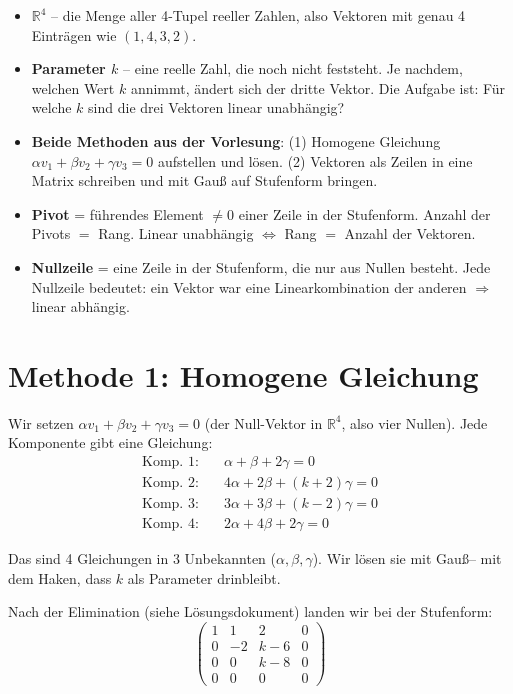 \documentclass[a4paper,12pt]{article}
\begin{document}
\begin{begriffe}
\begin{itemize}[leftmargin=*, nosep]
    \item $\mathbb{R}^4$ -- die Menge aller 4-Tupel reeller Zahlen, also Vektoren mit genau 4 Eintr\"agen wie $(1,4,3,2)$.
    \item \textbf{Parameter $k$} -- eine reelle Zahl, die noch nicht feststeht. Je nachdem, welchen Wert $k$ annimmt, \"andert sich der dritte Vektor. Die Aufgabe ist: F\"ur welche $k$ sind die drei Vektoren linear unabh\"angig?
    \item \textbf{Beide Methoden aus der Vorlesung}: (1) Homogene Gleichung $\alpha v_1 + \beta v_2 + \gamma v_3 = 0$ aufstellen und l\"osen. (2) Vektoren als Zeilen in eine Matrix schreiben und mit Gau\ss{} auf Stufenform bringen.
    \item \textbf{Pivot} = f\"uhrendes Element $\neq 0$ einer Zeile in der Stufenform. Anzahl der Pivots $=$ Rang. Linear unabh\"angig $\iff$ Rang $=$ Anzahl der Vektoren.
    \item \textbf{Nullzeile} = eine Zeile in der Stufenform, die nur aus Nullen besteht. Jede Nullzeile bedeutet: ein Vektor war eine Linearkombination der anderen $\Rightarrow$ linear abh\"angig.
\end{itemize}
\end{begriffe}

\section*{Methode 1: Homogene Gleichung}

Wir setzen $\alpha v_1 + \beta v_2 + \gamma v_3 = 0$ (der Null-Vektor in $\mathbb{R}^4$, also vier Nullen). Jede Komponente gibt eine Gleichung:
\begin{align*}
\text{Komp.\ 1:} &\quad \alpha + \beta + 2\gamma = 0 \\
\text{Komp.\ 2:} &\quad 4\alpha + 2\beta + (k+2)\gamma = 0 \\
\text{Komp.\ 3:} &\quad 3\alpha + 3\beta + (k-2)\gamma = 0 \\
\text{Komp.\ 4:} &\quad 2\alpha + 4\beta + 2\gamma = 0
\end{align*}

Das sind 4 Gleichungen in 3 Unbekannten ($\alpha, \beta, \gamma$). Wir l\"osen sie mit Gau\ss -- mit dem Haken, dass $k$ als Parameter drinbleibt.

Nach der Elimination (siehe L\"osungsdokument) landen wir bei der Stufenform:
\[
\left(\begin{array}{ccc|c}
1 & 1 & 2 & 0 \\
0 & -2 & k-6 & 0 \\
0 & 0 & k-8 & 0 \\
0 & 0 & 0 & 0
\end{array}\right)
\]
\end{document}
